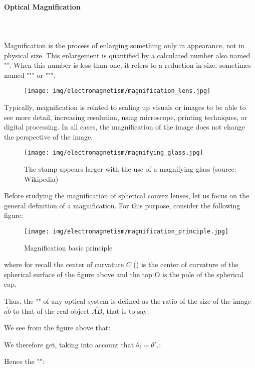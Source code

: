 	\paragraph{Optical Magnification}\mbox{}\\\\
	Magnification is the process of enlarging something only in appearance, not in physical size. This enlargement is quantified by a calculated number also named "". When this number is less than one, it refers to a reduction in size, sometimes named """ or """.
	\begin{figure}[H]
		\centering
		\texttt{[image: img/electromagnetism/magnification\_lens.jpg]}
	\end{figure}
	Typically, magnification is related to scaling up visuals or images to be able to see more detail, increasing resolution, using microscope, printing techniques, or digital processing. In all cases, the magnification of the image does not change the perspective of the image.
	\begin{figure}[H]
		\centering
		\texttt{[image: img/electromagnetism/magnifying\_glass.jpg]}
		\caption[]{The stamp appears larger with the use of a magnifying glass (source: Wikipedia)}
	\end{figure}
	Before studying the magnification of spherical convex lenses, let us focus on the general definition of a magnification. For this purpose, consider the following figure:
	\begin{figure}[H]
		\centering
		\texttt{[image: img/electromagnetism/magnification\_principle.jpg]}
		\caption[]{Magnification basic principle}
	\end{figure}
	where for recall the center of curvature $C$ () is the center of curvature of the spherical surface of the figure above and the top O is the pole of the spherical cap.

	Thus, the "" of any optical system is defined as the ratio of the size of the image $\overline{ab}$ to that of the real object $\overline{AB}$, that is to say:
	
	We see from the figure above that:
	
	We therefore get, taking into account that $\theta_i={\theta'}_r$:
	
	Hence the "":
	
